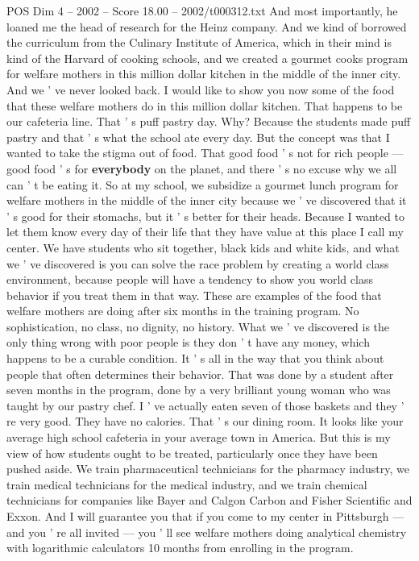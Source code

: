 \begin{textsample}{POS Dim 4 – 2002 – Score 18.00 – 2002/t000312.txt}
And most importantly, he loaned me the head of research for the Heinz company.
And we kind of borrowed the curriculum from the Culinary Institute of America, which in their mind is kind of the Harvard of cooking schools, and we created a gourmet cooks program for welfare mothers in this million dollar kitchen in the middle of the inner city.
And we ' ve never looked back.
I would like to show you now some of the food that these welfare mothers do in this million dollar kitchen.
That happens to be our cafeteria line.
That ' s puff pastry day.
Why?
Because the students made puff pastry and that ' s what the school ate every day.
But the concept was that I wanted to take the stigma out of food.
That good food ' s not for rich people — good food ' s for \textbf{everybody} on the planet, and there ' s no excuse why we all can ' t be eating it.
So at my school, we subsidize a gourmet lunch program for welfare mothers in the middle of the inner city because we ' ve discovered that it ' s good for their stomachs, but it ' s better for their heads.
Because I wanted to let them know every day of their life that they have value at this place I call my center.
We have students who sit together, black kids and white kids, and what we ' ve discovered is you can solve the race problem by creating a world class environment, because people will have a tendency to show you world class behavior if you treat them in that way.
These are examples of the food that welfare mothers are doing after six months in the training program.
No sophistication, no class, no dignity, no history.
What we ' ve discovered is the only thing wrong with poor people is they don ' t have any money, which happens to be a curable condition.
It ' s all in the way that you think about people that often determines their behavior.
That was done by a student after seven months in the program, done by a very brilliant young woman who was taught by our pastry chef.
I ' ve actually eaten seven of those baskets and they ' re very good.
They have no calories.
That ' s our dining room.
It looks like your average high school cafeteria in your average town in America.
But this is my view of how students ought to be treated, particularly once they have been pushed aside.
We train pharmaceutical technicians for the pharmacy industry, we train medical technicians for the medical industry, and we train chemical technicians for companies like Bayer and Calgon Carbon and Fisher Scientific and Exxon.
And I will guarantee you that if you come to my center in Pittsburgh — and you ' re all invited — you ' ll see welfare mothers doing analytical chemistry with logarithmic calculators 10 months from enrolling in the program.

\end{textsample}
